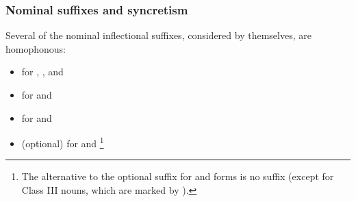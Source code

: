 \subsubsection{Nominal suffixes and syncretism}\label{nominalSuffixesSyncretism}
Several of the nominal inflectional suffixes, considered by themselves, are homophonous: %
\begin{itemize}
\item{ for , , and }
\item{ for  and }
\item{ for  and }
\item{(optional)  for  and \footnote{The alternative to the optional  suffix for  and  forms is no suffix (except for Class III nouns, which are marked by ).}}
\end{itemize}

